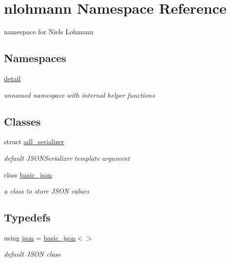 \hypertarget{namespacenlohmann}{}\section{nlohmann Namespace Reference}
\label{namespacenlohmann}


namespace for Niels Lohmann  


\subsection*{Namespaces}
\begin{DoxyCompactItemize}
\item 
 \mbox{\hyperlink{namespacenlohmann_1_1detail}{detail}}
\begin{DoxyCompactList}\small\item\em unnamed namespace with internal helper functions \end{DoxyCompactList}\end{DoxyCompactItemize}
\subsection*{Classes}
\begin{DoxyCompactItemize}
\item 
struct \mbox{\hyperlink{structnlohmann_1_1adl__serializer}{adl\+\_\+serializer}}
\begin{DoxyCompactList}\small\item\em default J\+S\+O\+N\+Serializer template argument \end{DoxyCompactList}\item 
class \mbox{\hyperlink{classnlohmann_1_1basic__json}{basic\+\_\+json}}
\begin{DoxyCompactList}\small\item\em a class to store J\+S\+ON values \end{DoxyCompactList}\end{DoxyCompactItemize}
\subsection*{Typedefs}
\begin{DoxyCompactItemize}
\item 
using \mbox{\hyperlink{namespacenlohmann_a2bfd99e845a2e5cd90aeaf1b1431f474}{json}} = \mbox{\hyperlink{classnlohmann_1_1basic__json}{basic\+\_\+json}}$<$$>$
\begin{DoxyCompactList}\small\item\em default J\+S\+ON class \end{DoxyCompactList}\end{DoxyCompactItemize}


